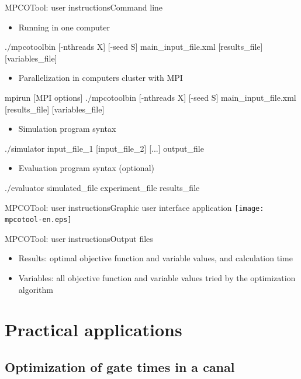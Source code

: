 \documentclass[10pt]{beamer}
\begin{document}
\begin{frame}{MPCOTool: user instructions}{Command line}
	\begin{itemize}
		\item Running in one computer
	\end{itemize}
.$/$mpcotoolbin [-nthreads X] [-seed S] main\_input\_file.xml [results\_file]
[variables\_file]
	\begin{itemize}
		\item Parallelization in computers cluster with MPI
	\end{itemize}
mpirun [MPI options] .$/$mpcotoolbin [-nthreads X] [-seed S]
main\_input\_file.xml [results\_file] [variables\_file]
	\begin{itemize}
		\item Simulation program syntax
	\end{itemize}
.$/$simulator input\_file\_1 [input\_file\_2] [...] output\_file
	\begin{itemize}
		\item Evaluation program syntax (optional)
	\end{itemize}
.$/$evaluator simulated\_file experiment\_file results\_file
\end{frame}

\begin{frame}{MPCOTool: user instructions}{Graphic user interface application}
	\texttt{[image: mpcotool-en.eps]}
\end{frame}

\begin{frame}{MPCOTool: user instructions}{Output files}
	\begin{itemize}
		\item Results: optimal objective function and variable values, and
			calculation time
		\item Variables: all objective function and variable values tried by the
			optimization algorithm
	\end{itemize}
\end{frame}

\section{Practical applications}

\subsection{Optimization of gate times in a canal}
\end{document}
